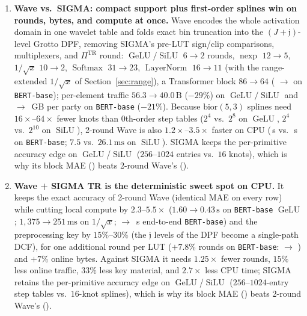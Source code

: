 \documentclass[11pt]{article}
\begin{document}
\begin{enumerate}
    \item \textbf{Wave vs.\ SIGMA: compact support plus first-order splines win on rounds, bytes, and compute at once.} Wave encodes the whole activation domain in one wavelet table and folds exact bin truncation into the $(J+\mathfrak{j})$-level Grotto DPF, removing SIGMA's pre-LUT sign/clip comparisons, multiplexers, and $\Pi^{\text{TR}}$ round: $\operatorname{GeLU}/\operatorname{SiLU}$ $6 \to 2$ rounds, $\operatorname{nexp}$ $12 \to 5$, $1/\sqrt{x}$ $10 \to 2$, $\operatorname{Softmax}$ $31 \to 23$, $\operatorname{LayerNorm}$ $16 \to 11$ (with the range-extended $1/\sqrt{x}$ of Section~\ref{sec:range}), a Transformer block $86 \to 64$ (\BertBaseSigmaRounds{} $\to$ \BertBaseWaveDetRounds{} on \texttt{BERT-base}); per-element traffic $56.3 \to 40.0\,\text{B}$ ($-29\%$) on $\operatorname{GeLU}/\operatorname{SiLU}$ and \BertBaseSigmaOnlineGB{} $\to$ \BertBaseWaveDetOnlineGB\,GB per party on \texttt{BERT-base} ($-21\%$). Because $\text{bior}(5,3)$ splines need $16\times$--$64\times$ fewer knots than 0th-order step tables ($2^4$ vs.\ $2^8$ on $\operatorname{GeLU}$, $2^4$ vs.\ $2^{10}$ on $\operatorname{SiLU}$), 2-round Wave is also $1.2\times$--$3.5\times$ faster on CPU (\BertBaseWaveDetTimeS\,s vs.\ \BertBaseSigmaTimeS\,s on \texttt{BERT-base}; $7.5$ vs.\ $26.1\,\text{ms}$ on $\operatorname{SiLU}$). SIGMA keeps the per-primitive accuracy edge on $\operatorname{GeLU}$/$\operatorname{SiLU}$ ($256$--$1024$ entries vs.\ $16$ knots), which is why its block MAE (\BertBaseSigmaMAE) beats 2-round Wave's (\BertBaseWaveDetMAE).
    \item \textbf{Wave + SIGMA TR is the deterministic sweet spot on CPU.} It keeps the exact accuracy of 2-round Wave (identical MAE on every row) while cutting local compute by $2.3$--$5.5\times$ ($1.60 \to 0.43\,\text{s}$ on \texttt{BERT-base} $\operatorname{GeLU}$; $1{,}375 \to 251\,\text{ms}$ on $1/\sqrt{x}$; \BertBaseWaveDetTimeS{} $\to$ \BertBaseWaveSigmaTrTimeS\,s end-to-end \texttt{BERT-base}) and the preprocessing key by $15\%$--$30\%$ (the $\mathfrak{j}$ levels of the DPF become a single-path DCF), for one additional round per LUT ($+7.8\%$ rounds on \texttt{BERT-base}: \BertBaseWaveDetRounds{} $\to$ \BertBaseWaveSigmaTrRounds) and $+7\%$ online bytes. Against SIGMA it needs $1.25\times$ fewer rounds, $15\%$ less online traffic, $33\%$ less key material, and $2.7\times$ less CPU time; SIGMA retains the per-primitive accuracy edge on $\operatorname{GeLU}$/$\operatorname{SiLU}$ ($256$--$1024$-entry step tables vs.\ $16$-knot splines), which is why its block MAE (\BertBaseSigmaMAE) beats 2-round Wave's (\BertBaseWaveDetMAE).

\end{enumerate}
\end{document}
